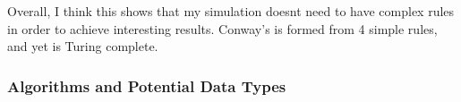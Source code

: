 \begin{flushleft}
                        \begin{figure}[h]
                            \centering
                        \end{figure}

                        Overall, I think this shows that my simulation doesnt need to have complex rules in order to achieve 
                        interesting results. Conway's is formed from 4 simple rules, and yet is Turing complete.

                \subsubsection{Algorithms and Potential Data Types}
                    \large
                    \vspace{0.2cm}

\end{flushleft}
